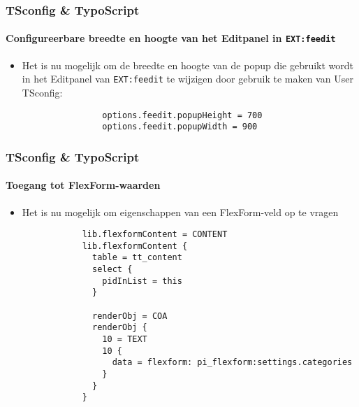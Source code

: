 \begin{frame}[fragile]
	\frametitle{TSconfig \& TypoScript}
	\framesubtitle{Configureerbare breedte en hoogte van het Editpanel in \texttt{EXT:feedit}}

	\lstset{basicstyle=\small\ttfamily}

	\begin{itemize}

		\item Het is nu mogelijk om de breedte en hoogte van de popup die gebruikt wordt in het Editpanel van \texttt{EXT:feedit}
		    te wijzigen door gebruik te maken van User TSconfig:
			\begin{lstlisting}
				options.feedit.popupHeight = 700
				options.feedit.popupWidth = 900
			\end{lstlisting}

	\end{itemize}

\end{frame}

\begin{frame}[fragile]
	\frametitle{TSconfig \& TypoScript}
	\framesubtitle{Toegang tot FlexForm-waarden}

	\lstset{basicstyle=\tiny\ttfamily}

	\begin{itemize}

		\item Het is nu mogelijk om eigenschappen van een FlexForm-veld op te vragen

		\begin{lstlisting}
			lib.flexformContent = CONTENT
			lib.flexformContent {
			  table = tt_content
			  select {
			    pidInList = this
			  }

			  renderObj = COA
			  renderObj {
			    10 = TEXT
			    10 {
			      data = flexform: pi_flexform:settings.categories
			    }
			  }
			}
		\end{lstlisting}

	\end{itemize}

\end{frame}

